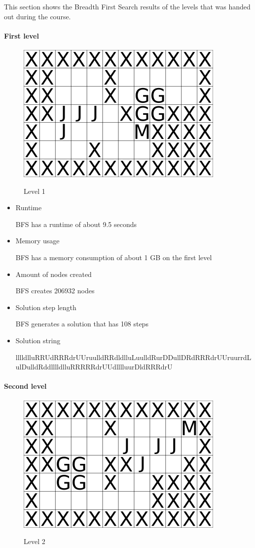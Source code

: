 \documentclass[../../main.tex]{subfiles}
\begin{document}
This section shows the Breadth First Search results of the levels that was handed out during the course.

\paragraph{First level}

\begin{figure}[h]
	\centering
	\includegraphics[width=0.4\linewidth]{images/level_1.png}
	\label{fig:images/level_1}
	\caption{Level 1}
	\label{fig:level_1}
\end{figure}

 \begin{itemize}

	\item Runtime 		
 		
 	BFS has a runtime of about 9.5 seconds
 		
	\item Memory usage
		
	BFS has a memory consumption of about 1 GB on the first level
	
	\item Amount of nodes created
	
	BFS creates 206932 nodes
	
	\item Solution step length
	
	BFS generates a solution that has 108 steps
	
	\item Solution string
	
	lllldlluRRUdRRRdrUUruulldRRdldlluLuulldRurDDullDRdRRRdrUUruurrdLulDulldRddlllldlluRRRRRdrUUdlllluurDldRRRdrU
		
 \end{itemize}

\paragraph{Second level}

\begin{figure}[h]
	\centering
	\includegraphics[width=0.4\linewidth]{images/level_2.png}
	\label{fig:images/level_2}
	\caption{Level 2}
	\label{fig:level_2}
\end{figure}
\end{document}
